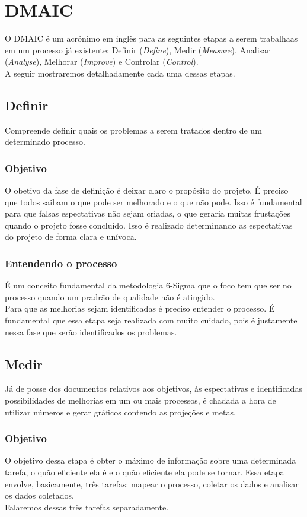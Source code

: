 \documentclass{abnt}
\begin{document}
			\section {DMAIC}
				O DMAIC é um acrônimo em inglês para as seguintes etapas a serem trabalhaas em 
				um processo já existente: Definir (\textit{Define}), Medir (\textit{Measure}), 
				Analisar (\textit{Analyse}), Melhorar (\textit{Improve}) e Controlar (\textit{Control}).
				\\
				A seguir mostraremos detalhadamente cada uma dessas etapas.
				
				\subsection {Definir}
					Compreende definir quais os problemas a serem tratados dentro de um determinado processo.
					\subsubsection {Objetivo}
					O obetivo da fase de definição é deixar claro o propósito do projeto. É preciso que todos
					saibam o que pode ser melhorado e o que não pode. Isso é fundamental para que falsas espectativas 
					não sejam criadas, o que geraria muitas frustações quando o projeto fosse concluído. Isso é 
					realizado determinando as espectativas do projeto de forma clara e unívoca.
					\subsubsection {Entendendo o processo}
					É um conceito fundamental da metodologia 6-Sigma que o foco tem que ser no processo
					quando um pradrão de qualidade não é atingido.\\
					Para que as melhorias sejam identificadas é preciso entender o processo.  
					É fundamental que essa etapa seja realizada com muito cuidado, pois é justamente nessa
					fase que serão identificados os problemas.
				\subsection {Medir}
					Já de posse dos documentos relativos aos objetivos, às espectativas e identificadas 
					possibilidades de melhorias em um ou mais processos, é chadada a hora de utilizar números 
					e gerar gráficos contendo as projeções e metas.
					\subsubsection {Objetivo}
					O objetivo dessa etapa é obter o máximo de informação sobre uma determinada tarefa, 
					o quão eficiente ela é e o quão eficiente ela pode se tornar. Essa etapa envolve, 
					basicamente, três tarefas: mapear o processo, coletar os dados e analisar os dados coletados.
					\\
					Falaremos dessas três tarefas separadamente.
\end{document}
